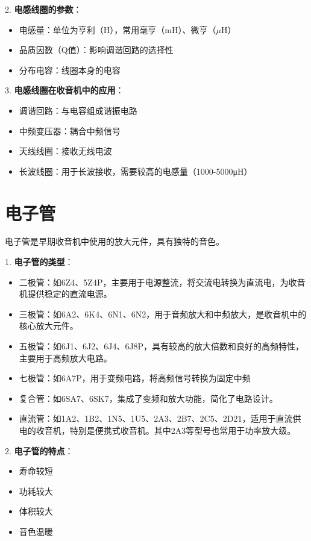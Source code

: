 \documentclass[12pt,UTF8]{ctexbook}
\begin{document}
2. \textbf{电感线圈的参数}：
   \begin{itemize}[leftmargin=3.5em]
   \item 电感量：单位为亨利（H），常用毫亨（mH）、微亨（$\mu$H）
   \item 品质因数（Q值）：影响调谐回路的选择性
   \item 分布电容：线圈本身的电容
   \end{itemize}

3. \textbf{电感线圈在收音机中的应用}：
   \begin{itemize}[leftmargin=3.5em]
   \item 调谐回路：与电容组成谐振电路
   \item 中频变压器：耦合中频信号
   \item 天线线圈：接收无线电波
   \item 长波线圈：用于长波接收，需要较高的电感量（1000-5000μH）
   \end{itemize}

\section{电子管}

电子管是早期收音机中使用的放大元件，具有独特的音色。

1. \textbf{电子管的类型}：
   \begin{itemize}[leftmargin=3.5em]
   \item 二极管：如6Z4、5Z4P，主要用于电源整流，将交流电转换为直流电，为收音机提供稳定的直流电源。
   \item 三极管：如6A2、6K4、6N1、6N2，用于音频放大和中频放大，是收音机中的核心放大元件。
   \item 五极管：如6J1、6J2、6J4、6J8P，具有较高的放大倍数和良好的高频特性，主要用于高频放大电路。
   \item 七极管：如6A7P，用于变频电路，将高频信号转换为固定中频
   \item 复合管：如6SA7、6SK7，集成了变频和放大功能，简化了电路设计。
   \item 直流管：如1A2、1B2、1N5、1U5、2A3、2B7、2C5、2D21，适用于直流供电的收音机，特别是便携式收音机。其中2A3等型号也常用于功率放大级。
   \end{itemize}

2. \textbf{电子管的特点}：
   \begin{itemize}[leftmargin=3.5em]
   \item 寿命较短
   \item 功耗较大
   \item 体积较大
   \item 音色温暖
   \end{itemize}
\end{document}
